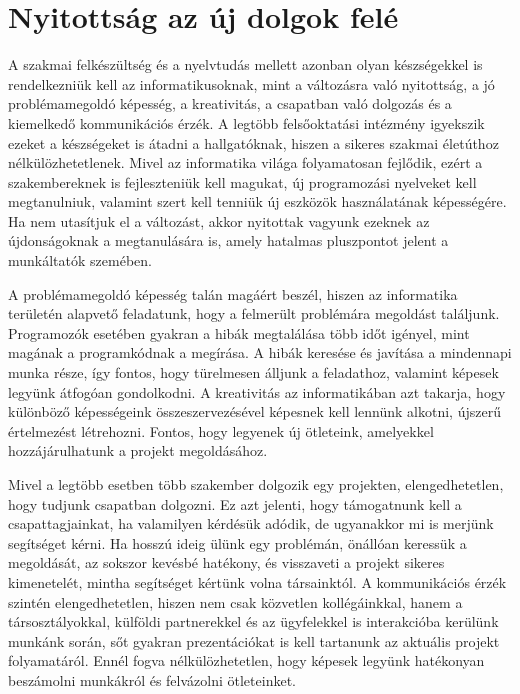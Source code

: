 \documentclass{thesis-ekf}
\begin{document}
\section{Nyitottság az új dolgok felé}
A szakmai felkészültség és a nyelvtudás mellett azonban olyan készségekkel is rendelkezniük kell az informatikusoknak, mint a változásra való nyitottság, a jó problémamegoldó képesség, a kreativitás, a csapatban való dolgozás és a kiemelkedő kommunikációs érzék. A legtöbb felsőoktatási intézmény igyekszik ezeket a készségeket is átadni a hallgatóknak, hiszen a sikeres szakmai életúthoz nélkülözhetetlenek. Mivel az informatika világa folyamatosan fejlődik, ezért a szakembereknek is fejleszteniük kell magukat, új programozási nyelveket kell megtanulniuk, valamint szert kell tenniük új eszközök használatának képességére. Ha nem utasítjuk el a változást, akkor nyitottak vagyunk ezeknek az újdonságoknak a megtanulására is, amely hatalmas pluszpontot jelent a munkáltatók szemében.

A problémamegoldó képesség talán magáért beszél, hiszen az informatika területén alapvető feladatunk, hogy a felmerült problémára megoldást találjunk. Programozók esetében gyakran a hibák megtalálása több időt igényel, mint magának a programkódnak a megírása. A hibák keresése és javítása a mindennapi munka része, így fontos, hogy türelmesen álljunk a feladathoz, valamint képesek legyünk átfogóan gondolkodni. A kreativitás az informatikában azt takarja, hogy különböző képességeink összeszervezésével képesnek kell lennünk alkotni, újszerű értelmezést létrehozni. Fontos, hogy legyenek új ötleteink, amelyekkel hozzájárulhatunk a projekt megoldásához.

Mivel a legtöbb esetben több szakember dolgozik egy projekten, elengedhetetlen, hogy tudjunk csapatban dolgozni. Ez azt jelenti, hogy támogatnunk kell a csapattagjainkat, ha valamilyen kérdésük adódik, de ugyanakkor mi is merjünk segítséget kérni. Ha hosszú ideig ülünk egy problémán, önállóan keressük a megoldását, az sokszor kevésbé hatékony, és visszaveti a projekt sikeres kimenetelét, mintha segítséget kértünk volna társainktól. A kommunikációs érzék szintén elengedhetetlen, hiszen nem csak közvetlen kollégáinkkal, hanem a társosztályokkal, külföldi partnerekkel és az ügyfelekkel is interakcióba kerülünk munkánk során, sőt gyakran prezentációkat is kell tartanunk az aktuális projekt folyamatáról. Ennél fogva nélkülözhetetlen, hogy képesek legyünk hatékonyan beszámolni munkákról és felvázolni ötleteinket.
\end{document}
